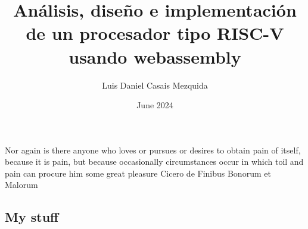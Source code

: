\documentclass[en]{uc3mthesisIEEE}
\begin{document}
  \title{Análisis, diseño e implementación de un procesador tipo RISC-V usando webassembly}
  \author{Luis Daniel Casais Mezquida}
  \date{June 2024}


  \makecover

  \makeepigraph
    {Nor again is there anyone who loves or pursues or desires to obtain pain of itself, because it is pain, but because occasionally circumstances occur in which toil and pain can procure him some great pleasure}  %
    {Cicero}  %
    {de Finibus Bonorum et Malorum}  %


  \begin{abstract}
    \lipsum[1-3]
  \end{abstract}


  \begin{acknowledgements}
    \lipsum[1-3]
  \end{acknowledgements}


  \tableofcontents
  \listoffigures
  \listoftables


  \begin{thesis}
    \newpage
  \end{thesis}


  \makebibliography


  \begin{appendices}
    \chapter{My stuff}
    \lipsum
  \end{appendices}
\end{document}
